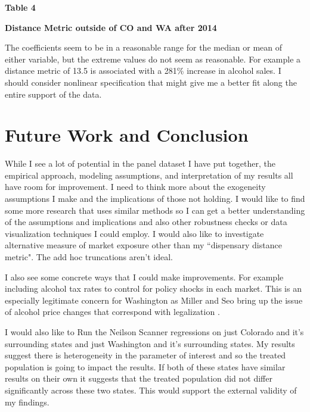 \documentclass[11pt]{article}
\begin{document}
\begin{center}
	
	\centering
	\LARGE{\textbf{Table 4}}\par\medskip
	
	\normalsize{\textbf{Distance Metric outside of CO and WA after 2014}}\par\medskip
	\scalebox{.8}{
		
	}
\end{center}

The coefficients seem to be in a reasonable range for the median or mean of either variable, but the extreme values do not seem as reasonable. For example a distance metric of 13.5 is associated with a 281\% increase in alcohol sales. I should consider nonlinear specification that might give me a better fit along the entire support of the data. 





\section{Future Work and Conclusion }
While I see a lot of potential in the panel dataset I have put together, the empirical approach, modeling assumptions, and interpretation of my results all have room for improvement. I need to think more about the exogeneity assumptions I make and the implications of those not holding. I would like to find some more research that uses similar methods so I can get a better understanding of the assumptions and implications and also other robustness checks or data visualization techniques I could employ. I would also like to investigate alternative measure of market exposure other than my ``dispensary distance metric". The add hoc truncations aren't ideal.  \par

I also see some concrete ways that I could make improvements. For example including alcohol tax rates to control for policy shocks in each market. This is an especially legitimate concern for Washington as Miller and Seo bring up the issue of alcohol price changes that correspond with legalization \cite{miller_seo_2018}. \par

I would also like to Run the Neilson Scanner regressions on just Colorado and it's surrounding states and just Washington and it's surrounding states. My results suggest there is heterogeneity in the parameter of interest and so the treated population is going to impact the results. If both of these states have similar results on their own it suggests that the treated population did not differ significantly across these two states. This would support the external validity of my findings. \par
\end{document}
